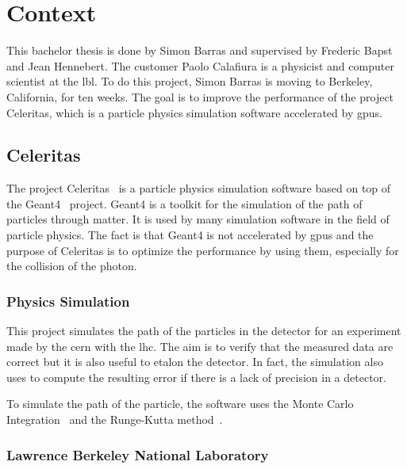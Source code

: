 \chapter{Context}
\label{spec:ch:context}

This bachelor thesis is done by Simon Barras and supervised by Frederic Bapst and Jean Hennebert.
The customer Paolo Calafiura is a physicist and computer scientist at the \acrfull{lbl}.
To do this project, Simon Barras is moving to Berkeley, California, for ten weeks.
The goal is to improve the performance of the project Celeritas, which is a particle physics simulation software accelerated by \acrshort{gpu}s.




\section{Celeritas}
\label{spec:ch:context:celeritas}

The project Celeritas~\cite{Celeritas-Project} is a particle physics simulation software based on top of the Geant4~\cite{Geant4} project.
Geant4 is a toolkit for the simulation of the path of particles through matter.
It is used by many simulation software in the field of particle physics.
The fact is that Geant4 is not accelerated by \acrshort{gpu}s and the purpose of Celeritas is to optimize the performance by using them, especially for the collision of the photon.



\subsection{Physics Simulation}
\label{spec:ch:context:celeritas:physics-simulation}

This project simulates the path of the particles in the detector for an experiment made by the \acrfull{cern} with the \acrfull{lhc}.
The aim is to verify that the measured data are correct but it is also useful to etalon the detector.
In fact, the simulation also uses to compute the resulting error if there is a lack of precision in a detector.

To simulate the path of the particle, the software uses the Monte Carlo Integration~\cite{Monte-Carlo-integration} and the Runge-Kutta method~\cite{Runge-Kutta-methods}.


\subsection{Lawrence Berkeley National Laboratory}
\label{spec:ch:context:celeritas:lbl}

